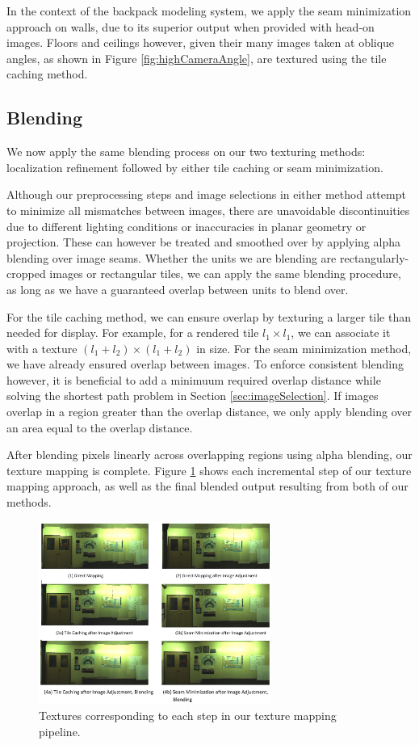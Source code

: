 \documentclass[10pt,twocolumn,letterpaper]{article}
\begin{document}
In the context of the backpack modeling system, we apply the seam
minimization approach on walls, due to its superior output when
provided with head-on images. Floors and ceilings however, given their
many images taken at oblique angles, as shown in Figure
\ref{fig:highCameraAngle}, are textured using the tile caching
method.

\subsection{Blending}
\label{sec:blending}
We now apply the same blending process on our two texturing methods:
localization refinement followed by either tile caching or seam
minimization.

Although our preprocessing steps and image selections in either method
attempt to minimize all mismatches between images, there are
unavoidable discontinuities due to different lighting conditions or
inaccuracies in planar geometry or projection. These can however be
treated and smoothed over by applying alpha blending over image seams.
Whether the units we are blending are rectangularly-cropped images or
rectangular tiles, we can apply the same blending procedure, as long
as we have a guaranteed overlap between units to blend over.

For the tile caching method, we can ensure overlap by texturing a
larger tile than needed for display. For example, for a rendered tile
$l_1 \times l_1$, we can associate it with a texture $(l_1 + l_2)
\times (l_1 + l_2)$ in size. For the seam minimization method, we have
already ensured overlap between images. To enforce consistent blending
however, it is beneficial to add a minimuum required overlap distance
while solving the shortest path problem in Section
\ref{sec:imageSelection}. If images overlap in a region greater than
the overlap distance, we only apply blending over an area equal to the
overlap distance.

After blending pixels linearly across overlapping
regions using alpha blending, our texture mapping is complete. Figure \ref{fig:pipelineimages} shows each incremental step of our texture mapping approach, as well as the final blended output resulting from both of our methods.

\begin{figure}
  \centering
  \includegraphics[width=3in]{pipelineimages.pdf}
  \caption{Textures corresponding to each step in our texture mapping pipeline.}
  \label{fig:pipelineimages}
\end{figure}
\end{document}
